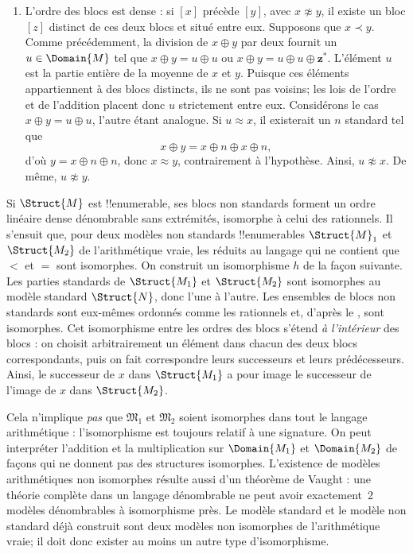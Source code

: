 \documentclass[../../../include/open-logic-section]{subfiles}
\begin{document}
\begin{enumerate}
  plus grand bloc.
\item L'ordre des blocs est dense : si $[x]$ précède $[y]$,
  avec $x \not\approx y$, il existe un bloc $[z]$ distinct
  de ces deux blocs et situé entre eux.
  Supposons que $x \prec y$. Comme précédemment, la division
  de $x \oplus y$ par deux fournit un $u \in \Domain{M}$
  tel que $x \oplus y = u \oplus u$ ou
  $x \oplus y = u \oplus u \oplus \mathbf{z}^*$.
  L'élément $u$ est la partie entière de la moyenne de $x$ et $y$.
  Puisque ces éléments appartiennent à des blocs distincts,
  ils ne sont pas voisins; les lois de l'ordre et de l'addition
  placent donc $u$ strictement entre eux.
  Considérons le cas $x \oplus y = u \oplus u$,
  l'autre étant analogue. Si $u \approx x$, il existerait un
  $n$ standard tel que
  \[
  x \oplus y = x \oplus n \oplus x \oplus n,
  \]
  d'où $y = x \oplus n \oplus n$, donc $x \approx y$,
  contrairement à l'hypothèse. Ainsi, $u \not\approx x$.
  De même, $u \not\approx y$.
\end{enumerate}

Si $\Struct{M}$ est !!{enumerable}, ses blocs non standards forment
un ordre linéaire dense dénombrable sans extrémités, isomorphe à celui des rationnels.
Il s'ensuit que, pour deux modèles non standards !!{enumerable}s
$\Struct{M}_1$ et $\Struct{M_2}$ de l'arithmétique vraie, les réduits
au langage qui ne contient que $<$ et $=$ sont isomorphes.
On construit un isomorphisme $h$ de la façon suivante.
Les parties standards de $\Struct{M_1}$ et $\Struct{M_2}$
sont isomorphes au modèle standard $\Struct{N}$, donc l'une à l'autre.
Les ensembles de blocs non standards sont eux-mêmes ordonnés comme
les rationnels et, d'après le , sont isomorphes.
Cet isomorphisme entre les ordres des blocs s'étend \emph{à l'intérieur}
des blocs : on choisit arbitrairement un élément dans chacun des
deux blocs correspondants, puis on fait correspondre leurs successeurs
et leurs prédécesseurs. Ainsi, le successeur de $x$ dans
$\Struct{M_1}$ a pour image le successeur de l'image de $x$
dans $\Struct{M_2}$.

Cela n'implique \emph{pas} que $\mathfrak{M}_1$ et $\mathfrak{M}_2$
soient isomorphes dans tout le langage arithmétique : l'isomorphisme
est toujours relatif à une signature. On peut interpréter l'addition
et la multiplication sur $\Domain{M_1}$ et $\Domain{M_2}$
de façons qui ne donnent pas des structures isomorphes.
L'existence de modèles arithmétiques non isomorphes résulte aussi
d'un théorème de Vaught : une théorie complète dans un langage
dénombrable ne peut avoir exactement~2 modèles dénombrables
à isomorphisme près. Le modèle standard et le modèle non standard
déjà construit sont deux modèles non isomorphes de l'arithmétique
vraie; il doit donc exister au moins un autre type d'isomorphisme.
\end{document}
